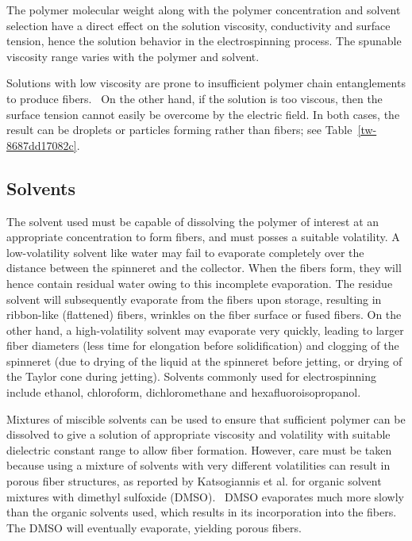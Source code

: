 \documentclass[5p,,preprint,12pt,twocolumn]{elsarticle}
\begin{document}
The polymer molecular weight along with the polymer concentration and solvent selection have a direct effect on the solution viscosity, conductivity and surface tension, hence the solution behavior in the electrospinning process. The spunable viscosity range varies with the polymer and solvent. 

Solutions with low viscosity are prone to insufficient polymer chain entanglements to produce fibers.\unskip~\cite{527120:13082763} On the other hand, if the solution is too viscous, then the surface tension cannot easily be overcome by the electric field. In both cases, the result can be droplets or particles forming rather than fibers; see Table~\ref{tw-8687dd17082c}.



\subsection{Solvents}The solvent used must be capable of dissolving the polymer of interest at an appropriate concentration to form fibers, and must posses a suitable volatility. A low-volatility solvent like water may fail to evaporate completely over the distance between the spinneret and the collector. When the fibers form, they will hence contain residual water owing to this incomplete evaporation. The residue solvent will subsequently evaporate from the fibers upon storage, resulting in ribbon-like (flattened) fibers, wrinkles on the fiber surface or fused fibers. On the other hand, a high-volatility solvent may evaporate very quickly, leading to larger fiber diameters (less time for elongation before solidification) and clogging of the spinneret (due to drying of the liquid at the spinneret before jetting, or drying of the Taylor cone during jetting). Solvents commonly used for electrospinning include ethanol, chloroform, dichloromethane and hexafluoroisopropanol.

Mixtures of miscible solvents can be used to ensure that sufficient polymer can be dissolved to give a solution of appropriate viscosity and volatility with suitable dielectric constant range to allow fiber formation. However, care must be taken because using a mixture of solvents with very different volatilities can result in porous fiber structures, as reported by Katsogiannis et al. for organic solvent mixtures with dimethyl sulfoxide (DMSO).\unskip~\cite{527120:13082766} DMSO evaporates much more slowly than the organic solvents used, which results in its incorporation into the fibers. The DMSO will eventually evaporate, yielding porous fibers.
\end{document}
